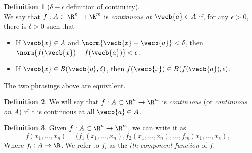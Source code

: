 \documentclass[a5paper]{article}
\theoremstyle{definition}%
\newtheorem*{definition*}{Definition}
\numberwithin{exercise}{section}
\theoremstyle{remark}%
\begin{document}

\begin{highlight}
\begin{definition*}[$\delta-\epsilon$ definition of continuity]\mbox{}\\
We say that $f:A\subset \R^n \to \R^m$ is \emph{continuous at $\vecb{a}\in A$} if, for any $\epsilon >0$, there is $\delta>0$ such that 
\begin{itemize}
\item If $\vecb{x}\in A$ and $\norm{\vecb{x}-\vecb{a}}<\delta$, then $\norm{f(\vecb{x})-f(\vecb{a})}<\epsilon$. 
\item If $\vecb{x}\in B(\vecb{a},\delta)$, then $f(\vecb{x})\in B(f(\vecb{a}),\epsilon)$. 
\end{itemize}
The two phrasings above are equivalent. 
\end{definition*}
\end{highlight}

\begin{highlight}
\begin{definition*}
We will say that $f:A\subset \R^n \to \R^m$ is \emph{continuous} (or \emph{continuous on $A$}) if it is continuous at all $\vecb{a}\in A$. 
\end{definition*}
\end{highlight}

\begin{highlight}
\begin{definition*}
Given $f:A\subset \R^n \to \R^m$, we can write it as 
$$f(x_1, \ldots, x_n)=(f_1(x_1, \ldots, x_n), f_2(x_1, \ldots, x_n), \ldots, f_m(x_1, \ldots, x_n),$$
Where $f_i:A\to \R$. We refer to $f_i$ as the \emph{$i$th component function} of $f$. 
\end{definition*}
\end{highlight}
\end{document}
